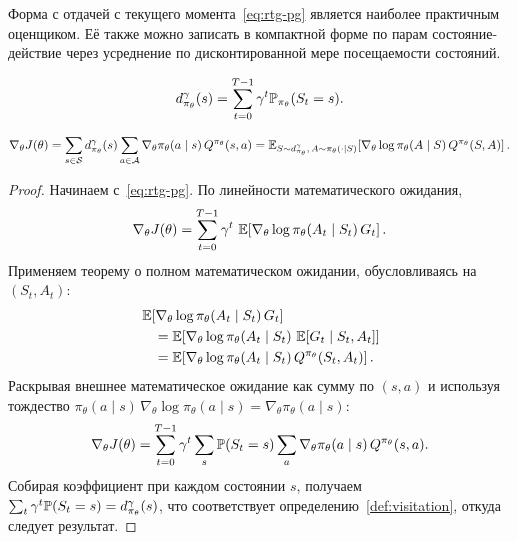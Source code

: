 Форма с отдачей с текущего момента~\eqref{eq:rtg-pg} является наиболее практичным оценщиком. Её также можно записать в компактной форме по парам состояние-действие через усреднение по дисконтированной мере посещаемости состояний.

\begin{definition}
\label{def:visitation}
\[
d^{\gamma}_{\pi_\theta}(s) = \sum_{t=0}^{T-1} \gamma^t \mathbb{P}_{\pi_\theta}(S_t = s).
\]
\end{definition}

\begin{theorem}
\label{thm:pgt}
\begin{equation}
\label{eq:pgt}
\nabla_\theta J(\theta)
= \sum_{s \in \mathcal{S}} d^{\gamma}_{\pi_\theta}(s) \sum_{a \in \mathcal{A}} \nabla_\theta \pi_\theta(a \mid s)\, Q^{\pi_\theta}(s,a)
= \operatorname{\mathbb{E}}_{S \sim d^{\gamma}_{\pi_\theta},\, A \sim \pi_\theta(\cdot \mid S)}\!\left[\nabla_\theta \log \pi_\theta(A \mid S)\, Q^{\pi_\theta}(S,A)\right].
\end{equation}
\end{theorem}

\begin{proof}
Начинаем с~\eqref{eq:rtg-pg}. По линейности математического ожидания,
\[
\nabla_\theta J(\theta)
= \sum_{t=0}^{T-1} \gamma^t\, \operatorname{\mathbb{E}}\!\left[\nabla_\theta \log \pi_\theta(A_t \mid S_t)\, G_t\right].
\]
Применяем теорему о полном математическом ожидании, обусловливаясь на $(S_t, A_t)$:
\begin{align*}
&\operatorname{\mathbb{E}}\!\left[\nabla_\theta \log \pi_\theta(A_t \mid S_t)\, G_t\right]\\
&\quad= \operatorname{\mathbb{E}}\!\left[\nabla_\theta \log \pi_\theta(A_t \mid S_t)\, \operatorname{\mathbb{E}}[G_t \mid S_t, A_t]\right]\\
&\quad= \operatorname{\mathbb{E}}\!\left[\nabla_\theta \log \pi_\theta(A_t \mid S_t)\, Q^{\pi_\theta}(S_t, A_t)\right].
\end{align*}
Раскрывая внешнее математическое ожидание как сумму по $(s,a)$ и используя тождество $\pi_\theta(a \mid s)\, \nabla_\theta \log \pi_\theta(a \mid s) = \nabla_\theta \pi_\theta(a \mid s)$:
\[
\nabla_\theta J(\theta)
= \sum_{t=0}^{T-1} \gamma^t \sum_s \mathbb{P}(S_t = s) \sum_a \nabla_\theta \pi_\theta(a \mid s)\, Q^{\pi_\theta}(s,a).
\]
Собирая коэффициент при каждом состоянии $s$, получаем $\sum_t \gamma^t \mathbb{P}(S_t = s) = d^{\gamma}_{\pi_\theta}(s)$, что соответствует определению~\ref{def:visitation}, откуда следует результат.
\end{proof}

